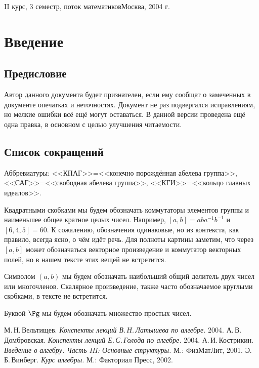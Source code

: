 \documentclass[a4paper]{article}
\begin{document}
{II курс, 3 семестр, поток математиков}{Москва, 2004 г.}

\pagebreak
\tableofcontents
\pagebreak

\section*{Введение}
\subsection*{Предисловие}

Автор данного документа будет признателен, если ему сообщат о
замеченных в документе опечатках и неточностях.  Документ не раз
подвергался исправлениям, но мелкие ошибки всё ещё могут оставаться.
В данной версии проведена ещё одна правка, в основном с целью
улучшения читаемости.

\medskip\dmvntrail

\subsection*{Список сокращений}

\begin{points}{-3}
\item Аббревиатуры: <<КПАГ>>=<<конечно порождённая абелева группа>>,
      <<САГ>>=<<свободная абелева группа>>, <<КГИ>>=<<кольцо главных идеалов>>.
\item Квадратными скобками мы будем обозначать коммутаторы элементов группы и наименьшее общее кратное
      целых чисел. Например, $[a,b] = aba^{-1}b^{-1}$ и $[6,4,5] = 60$.
      К сожалению, обозначения одинаковые, но из контекста, как правило, всегда ясно,
      о чём идёт речь. Для полноты картины заметим, что через $[a,b]$ может обозначаться векторное
      произведение и коммутатор векторных полей, но в нашем тексте этих вещей не встретится.
\item Символом $(a,b)$ мы будем обозначать наибольший общий делитель двух чисел или многочленов.
      Скалярное произведение, также часто обозначаемое круглыми скобками, в тексте не встретится.
\item Буквой $\Pg$ мы будем обозначать множество простых чисел.
\end{points}

\begin{thebibliography}{4}
    \setlength\itemsep{-3pt}
     М.\,Н.\,Вельтищев. \emph{Конспекты лекций В.\,Н.\,Латышева по алгебре.} 2004.
        А.\,В.\,Домбровская. \emph{Конспекты лекций Е.\,С.\,Голода по алгебре.} 2004.
             А.\,И.\,Кострикин. \emph{Введение в алгебру. Часть III: Основные структуры.} М.: ФизМатЛит, 2001.
               Э.\,Б.\,Винберг. \emph{Курс алгебры.} М.: Факториал Пресс, 2002.
\end{thebibliography}
\end{document}
